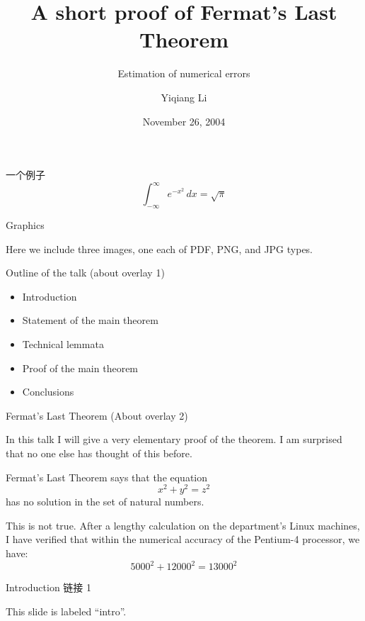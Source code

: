 \documentclass[t]{beamer}
\title[A short proof]{A short proof of Fermat's Last Theorem}
\subtitle[Errors]{Estimation of numerical errors}
\author[Y. Li]{Yiqiang Li}
\institute[NWPU]{
Department of Applied Mathematics \\
Northwestern Polytechnical University, \\
Xi'An, China 710072\\[1ex]
\texttt{liyiqiang@mail.nwpu.edu.cn}
}
\date[November 2004]{November 26, 2004}
\begin{document}
\begin{frame}[plain]
	\titlepage
\end{frame}

\begin{frame}{一个例子}
	\[
	\int_{-\infty}^\infty e^{-x^2} \, dx =\sqrt{\pi}
	\]	

\end{frame}

\begin{frame}{Graphics} 

	Here we include three images, one each of PDF, PNG, and JPG types. 

	\begin{center} 
		\end{center} 

	\end{frame} 

	\begin{frame}{Outline of the talk (about overlay 1)} 

		\begin{itemize} 
			\item Introduction 
				\pause 
			\item Statement of the main theorem 
				\pause 
			\item Technical lemmata 
				\pause 
			\item Proof of the main theorem 
				\pause 
			\item Conclusions 
		\end{itemize} 

	\end{frame} 

	\begin{frame}{Fermat's Last Theorem (About overlay 2)} 

		In this talk I will give a very elementary proof of the 
		theorem.  I am surprised that no one else has thought of 
		this before. 
		\medskip 

		\pause 

		Fermat's Last Theorem says that the equation 
		\[ 
		x^2 + y^2 = z^2 
		\] 
		has no solution in the set of natural numbers. 
		\medskip 

		\pause 

		This is not true.  After a lengthy calculation on the 
		department's Linux machines, I have verified that within 
		the numerical accuracy of the Pentium-4 processor, we have: 
		\[ 
		5000^2 + 12000^2 = 13000^2 
		\] 

	\end{frame} 
	\begin{frame}[label=intro]{Introduction 链接 1}

		This slide is labeled ``intro''.

	\end{frame}
\end{document}
